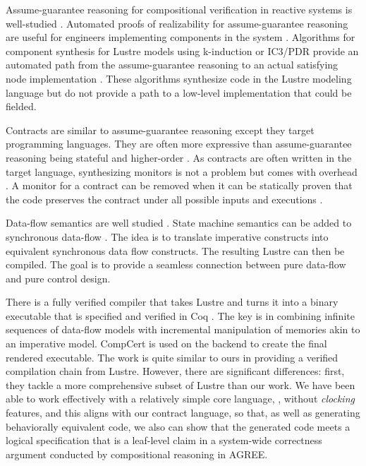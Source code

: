 Assume-guarantee reasoning for compositional verification in reactive systems is well-studied \cite{10.1007/978-3-642-28891-3_13, agree2013, 10.1145/2658982.2527272, 10.1007/978-3-319-17524-9_7}. Automated proofs of realizability for assume-guarantee reasoning are useful for engineers implementing components in the system \cite{10.1007/978-3-319-17524-9_13, 10.1007/978-3-319-29613-5_7}. Algorithms for %
component synthesis for Lustre models using k-induction or IC3/PDR provide an automated path from the assume-guarantee reasoning to an actual satisfying node implementation \cite{katis2017synthesis, 10.1007/978-3-319-89963-3_10}. These algorithms synthesize code in the Lustre modeling language but do not provide a path to a low-level implementation that could be fielded.

Contracts are similar to assume-guarantee reasoning except they target programming languages. They are often more expressive than assume-guarantee reasoning being stateful and higher-order \cite{10.1145/583852.581484}. As contracts are often written in the target language, synthesizing monitors is not a problem but comes with %
overhead \cite{10.1007/978-3-642-28869-2_11}. A monitor for a contract can be removed when it can be statically proven that the code preserves the contract under all possible inputs and executions \cite{10.1145/3158139}.

Data-flow semantics are well studied \cite{10.1145/41625.41641,97300,
10.1145/1379023.1375674,10.1145/2345141.2248426,10.1007/978-3-540-45212-6_10}. State
machine semantics can be added to synchronous
data-flow \cite{10.1145/1086228.1086261}. The idea is to translate
imperative constructs into equivalent synchronous data flow
constructs. The resulting Lustre can then be compiled. The goal is to
provide a seamless connection between pure data-flow and pure control
design.

There is a fully verified compiler that takes Lustre and turns it into
a binary executable that is specified and verified in
Coq \cite{10.1145/3140587.3062358}. The key is in combining infinite
sequences of data-flow models with incremental manipulation of
memories akin to an imperative model. CompCert is used on the backend
to create the final rendered executable. The work is quite similar to
ours in providing a verified compilation chain from Lustre. However,
there are significant differences: first, they tackle a more
comprehensive subset of Lustre than our work. We have been able to
work effectively with a relatively simple core language, \eg, without
\emph{clocking} features, and this aligns with our contract language, so that, as well as generating behaviorally equivalent code, we also can show that the generated code meets a logical specification that is a leaf-level claim in a system-wide correctness argument conducted by compositional reasoning in AGREE.

